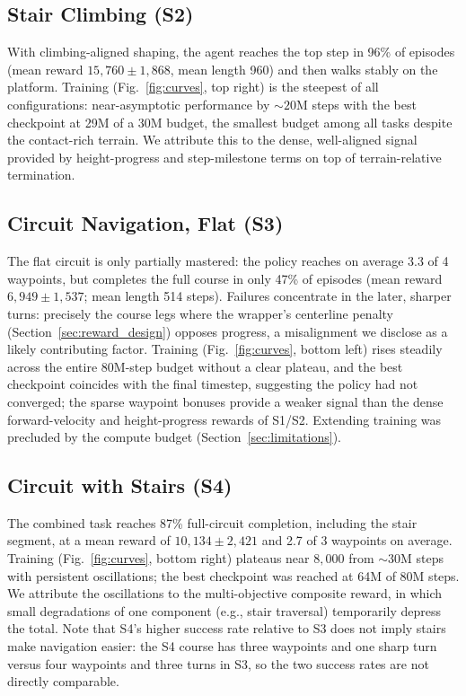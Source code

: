 \documentclass[conference,a4paper]{IEEEtran}
\begin{document}
\subsection{Stair Climbing (S2)}
With climbing-aligned shaping, the agent reaches the top step in 96\% of episodes (mean reward $15{,}760 \pm 1{,}868$, mean length 960) and then walks stably on the platform. Training (Fig.~\ref{fig:curves}, top right) is the steepest of all configurations: near-asymptotic performance by ${\sim}20$M steps with the best checkpoint at 29M of a 30M budget, the smallest budget among all tasks despite the contact-rich terrain. We attribute this to the dense, well-aligned signal provided by height-progress and step-milestone terms on top of terrain-relative termination.

\subsection{Circuit Navigation, Flat (S3)}
The flat circuit is only partially mastered: the policy reaches on average 3.3 of 4 waypoints, but completes the full course in only 47\% of episodes (mean reward $6{,}949 \pm 1{,}537$; mean length 514 steps). Failures concentrate in the later, sharper turns: precisely the course legs where the wrapper's centerline penalty (Section~\ref{sec:reward_design}) opposes progress, a misalignment we disclose as a likely contributing factor. Training (Fig.~\ref{fig:curves}, bottom left) rises steadily across the entire 80M-step budget without a clear plateau, and the best checkpoint coincides with the final timestep, suggesting the policy had not converged; the sparse waypoint bonuses provide a weaker signal than the dense forward-velocity and height-progress rewards of S1/S2. Extending training was precluded by the compute budget (Section~\ref{sec:limitations}).

\subsection{Circuit with Stairs (S4)}
The combined task reaches 87\% full-circuit completion, including the stair segment, at a mean reward of $10{,}134 \pm 2{,}421$ and 2.7 of 3 waypoints on average. Training (Fig.~\ref{fig:curves}, bottom right) plateaus near $8{,}000$ from ${\sim}30$M steps with persistent oscillations; the best checkpoint was reached at 64M of 80M steps. We attribute the oscillations to the multi-objective composite reward, in which small degradations of one component (e.g., stair traversal) temporarily depress the total. Note that S4's higher success rate relative to S3 does not imply stairs make navigation easier: the S4 course has three waypoints and one sharp turn versus four waypoints and three turns in S3, so the two success rates are not directly comparable.
\end{document}
